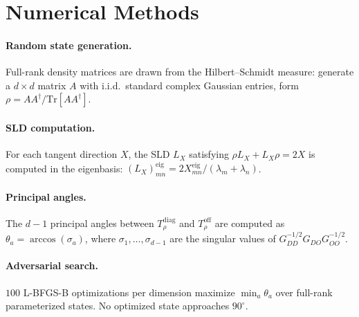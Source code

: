 \documentclass[12pt,a4paper]{article}
\theoremstyle{definition}
\theoremstyle{remark}
\begin{document}



\appendix
\section{Numerical Methods}
\label{app:numerics}

\paragraph{Random state generation.}
Full-rank density matrices are drawn from the Hilbert--Schmidt measure: generate a $d \times d$ matrix $A$ with i.i.d.\ standard complex Gaussian entries, form $\rho = AA^\dagger/\mathrm{Tr}[AA^\dagger]$.

\paragraph{SLD computation.}
For each tangent direction $X$, the SLD $L_X$ satisfying $\rho L_X + L_X \rho = 2X$ is computed in the eigenbasis: $(L_X)_{mn}^{\mathrm{eig}} = 2X_{mn}^{\mathrm{eig}}/(\lambda_m + \lambda_n)$.

\paragraph{Principal angles.}
The $d - 1$ principal angles between $T_\rho^{\mathrm{diag}}$ and $T_\rho^{\mathrm{off}}$ are computed as $\theta_a = \arccos(\sigma_a)$, where $\sigma_1, \ldots, \sigma_{d-1}$ are the singular values of $G_{DD}^{-1/2} G_{DO} G_{OO}^{-1/2}$.

\paragraph{Adversarial search.}
$100$ L-BFGS-B optimizations per dimension maximize $\min_a \theta_a$ over full-rank parameterized states. No optimized state approaches $90^\circ$.
\end{document}
